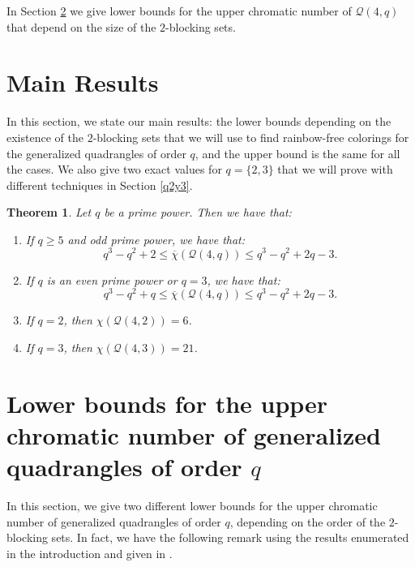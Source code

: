 \documentclass[12pt]{article}
\newtheorem{theorem}{Theorem}[section]
\begin{document}
In Section \ref{lowerbounds} we give lower bounds for the upper chromatic number of $\mathcal{Q}(4,q)$ that depend on the size of the $ 2$-blocking sets.



\section{Main Results}\label{results}

In this section, we state our main results: the lower bounds depending on the existence of the $2$-blocking sets that we will use to find rainbow-free colorings for the generalized quadrangles of order $q$, and the upper bound is the same for all the cases. We also give two exact values for $q=\{2,3\}$ that we will prove with different techniques in Section \ref{q2y3}. 

\begin{theorem}\label{mainthm}
Let $q$ be a prime power. Then we have that: 
\begin{enumerate}

\item If $q\geq 5$ and odd prime power, we have that:
$$q^3-q^2+2\le \overline{\chi}(\mathcal{Q}(4,q))\le q^3-q^2+2q-3. $$

\item If $q$ is an even prime power or $q=3$, we have that: 
$$q^3-q^2+q\le\overline{\chi}(\mathcal{Q}(4,q))\le  q^3-q^2+2q-3.$$

\item If $q=2$, then $\chi(\mathcal{Q}(4,2))=6$.

\item If $q=3$, then $\chi(\mathcal{Q}(4,3))=21$.
\end{enumerate}
\end{theorem}


\section{Lower bounds for the upper chromatic number of generalized quadrangles of order $q$}\label{lowerbounds}

In this section, we give two different lower bounds for the upper chromatic number of generalized quadrangles of order $q$, depending on the order of the $2$-blocking sets. 
%
In fact, we have the following remark using the results enumerated in the introduction and given in \cite{daisyPP,2ovoid,Cossi,D2000}.
\end{document}
